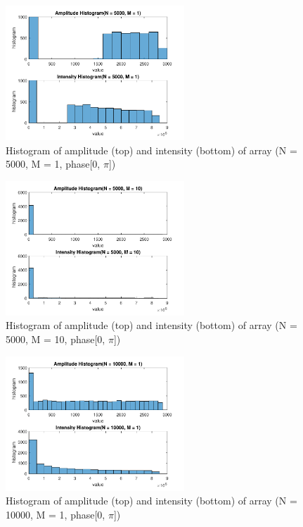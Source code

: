 \documentclass{article}
\begin{document}
\begin{figure}[H]
	\centering
	\includegraphics[width = 0.6\textwidth]{src/pi/hist_5000_1.pdf}
	\caption{Histogram of amplitude (top) and intensity (bottom) of array (N = 5000, M = 1, phase[0, $\pi$])}
	\label{fig:hist-5000-1-pi}
\end{figure}
\begin{figure}[H]
	\centering
	\includegraphics[width = 0.6\textwidth]{src/pi/hist_5000_10.pdf}
	\caption{Histogram of amplitude (top) and intensity (bottom) of array (N = 5000, M = 10, phase[0, $\pi$])}
	\label{fig:hist-5000-10-pi}
\end{figure}
\begin{figure}[H]
	\centering
	\includegraphics[width = 0.6\textwidth]{src/pi/hist_10000_1.pdf}
	\caption{Histogram of amplitude (top) and intensity (bottom) of array (N = 10000, M = 1, phase[0, $\pi$])}
	\label{fig:hist-10000-1-pi}
\end{figure}
\end{document}
